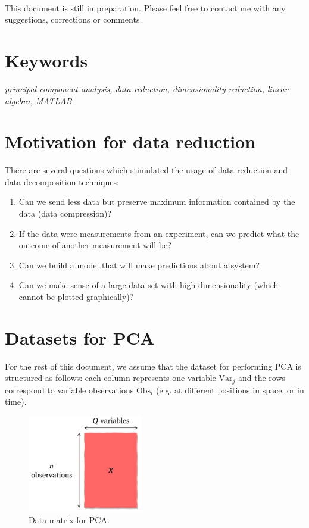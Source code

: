 \documentclass[10pt,twocolumn]{article}
\begin{document}
\,\,

This document is still in preparation. Please feel free to contact me with any suggestions, corrections or comments.

\section*{Keywords}

\textit{principal component analysis, data reduction, dimensionality reduction, linear algebra, MATLAB\textregistered}

\tableofcontents

\section{Motivation for data reduction}

There are several questions which stimulated the usage of data reduction and data decomposition techniques:

\begin{enumerate}
\item Can we send less data but preserve maximum information contained by the data (data compression)?

\item If the data were measurements from an experiment, can we predict what the outcome of another measurement will be?

\item Can we build a model that will make predictions about a system?

\item Can we make sense of a large data set with high-dimensionality (which cannot be plotted graphically)?
\end{enumerate}

\section{Datasets for PCA}

For the rest of this document, we assume that the dataset for performing PCA is structured as follows: each column represents one variable $\text{Var}_j$ and the rows correspond to variable observations $\text{Obs}_i$ (e.g. at different positions in space, or in time).

\begin{figure}[H]
\centering\includegraphics[width=5cm]{data-set-PCA.png}
\caption{Data matrix for PCA.}
\label{fig:data-matrix}
\end{figure}
\end{document}

